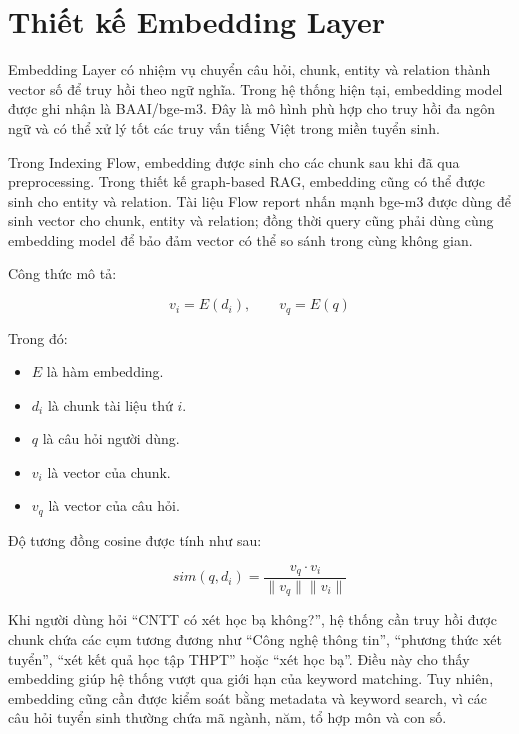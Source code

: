 \section{Thiết kế Embedding Layer}

Embedding Layer có nhiệm vụ chuyển câu hỏi, chunk, entity và relation thành vector số để truy hồi theo ngữ nghĩa. Trong hệ thống hiện tại, embedding model được ghi nhận là BAAI/bge-m3. Đây là mô hình phù hợp cho truy hồi đa ngôn ngữ và có thể xử lý tốt các truy vấn tiếng Việt trong miền tuyển sinh.

Trong Indexing Flow, embedding được sinh cho các chunk sau khi đã qua preprocessing. Trong thiết kế graph-based RAG, embedding cũng có thể được sinh cho entity và relation. Tài liệu Flow report nhấn mạnh bge-m3 được dùng để sinh vector cho chunk, entity và relation; đồng thời query cũng phải dùng cùng embedding model để bảo đảm vector có thể so sánh trong cùng không gian.

Công thức mô tả:

\begin{equation}
v_i = E(d_i), \qquad v_q = E(q)
\end{equation}

Trong đó:

\begin{itemize}
    \item $E$ là hàm embedding.
    \item $d_i$ là chunk tài liệu thứ $i$.
    \item $q$ là câu hỏi người dùng.
    \item $v_i$ là vector của chunk.
    \item $v_q$ là vector của câu hỏi.
\end{itemize}

Độ tương đồng cosine được tính như sau:

\begin{equation}
sim(q, d_i) = \frac{v_q \cdot v_i}{\|v_q\| \|v_i\|}
\end{equation}

Khi người dùng hỏi ``CNTT có xét học bạ không?'', hệ thống cần truy hồi được chunk chứa các cụm tương đương như ``Công nghệ thông tin'', ``phương thức xét tuyển'', ``xét kết quả học tập THPT'' hoặc ``xét học bạ''. Điều này cho thấy embedding giúp hệ thống vượt qua giới hạn của keyword matching. Tuy nhiên, embedding cũng cần được kiểm soát bằng metadata và keyword search, vì các câu hỏi tuyển sinh thường chứa mã ngành, năm, tổ hợp môn và con số.

